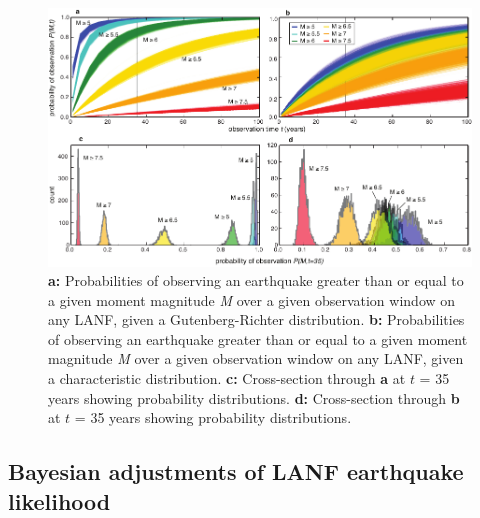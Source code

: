\documentclass[draft,grl]{AGUTeX}
\begin{document}
\begin{article}
\begin{figure}%
\noindent\includegraphics[width=40pc]{./figures/all_probs_2x2.pdf}

\caption{\textbf{a:} Probabilities of observing an earthquake greater than or
equal to a given moment magnitude \emph{M} over a given observation window on
any LANF, given a Gutenberg-Richter distribution.  \textbf{b:} Probabilities of
observing an earthquake greater than or equal to a given moment magnitude
\emph{M} over a given observation window on any LANF, given a characteristic
distribution.  \textbf{c:} Cross-section through \textbf{a} at $t$ = 35 years
showing probability distributions.  \textbf{d:} Cross-section through
\textbf{b} at $t$ = 35 years showing probability distributions.}

\label{fig:all_probs}
\end{figure}

\subsection{Bayesian adjustments of LANF earthquake likelihood}


\end{article}
\end{document}
